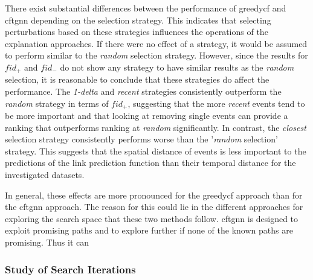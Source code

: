 There exist substantial differences between the performance of \gls{greedycf} and \gls{cftgnn} depending on the selection strategy. This indicates that selecting perturbations based on these strategies influences the operations of the explanation approaches. If there were no effect of a strategy, it would be assumed to perform similar to the \textit{random} selection strategy. However, since the results for $fid_+$ and $fid_-$ do not show any strategy to have similar results as the \textit{random} selection, it is reasonable to conclude that these strategies do affect the performance. The \textit{1-delta} and \textit{recent} strategies consistently outperform the \textit{random} strategy in terms of $fid_+$, suggesting that the more \textit{recent} events tend to be more important and that looking at removing single events can provide a ranking that outperforms ranking at \textit{random} significantly. In contrast, the \textit{closest} selection strategy consistently performs worse than the '\textit{random} selection' strategy. This suggests that the spatial distance of events is less important to the predictions of the link prediction function than their temporal distance for the investigated datasets.

In general, these effects are more pronounced for the \gls{greedycf} approach than for the \gls{cftgnn} approach. The reason for this could lie in the different approaches for exploring the search space that these two methods follow. \gls{cftgnn} is designed to exploit promising paths and to explore further if none of the known paths are promising. Thus it can 


\subsubsection{Study of Search Iterations}
\label{s_Evaluation_Results_Iterations}

